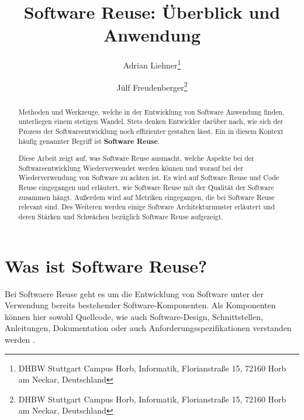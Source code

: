 \documentclass[utf8,biblatex]{lni}
\begin{document}
\title[Software Reuse]{Software Reuse: Überblick und Anwendung}
\author[Adrian Liehner \and Jülf Freudenberger]
{Adrian Liehner\footnote{DHBW Stuttgart Campus Horb, Informatik, Florianstraße 15, 72160 Horb am Neckar, Deutschland } \and
 Jülf Freudenberger\footnote{DHBW Stuttgart Campus Horb, Informatik, Florianstraße 15, 72160 Horb am Neckar, Deutschland }}
\maketitle


\begin{abstract}
Methoden und Werkzeuge, welche in der Entwicklung von Software Anwendung finden, unterliegen einem stetigen Wandel. Stets denken Entwickler darüber nach, wie sich der Prozess der Softwareentwicklung noch effizienter gestalten lässt. Ein in diesem Kontext häufig genannter Begriff ist \textbf{Software Reuse}. 

Diese Arbeit zeigt auf, was Software Reuse ausmacht, welche Aspekte bei der Softwareentwicklung Wiederverwendet werden können und worauf bei der Wiederverwendung von Software zu achten ist. Es wird auf Software Reuse und Code Reuse eingegangen und erläutert, wie Software Reuse mit der Qualität der Software zusammen hängt. Außerdem wird auf Metriken eingegangen, die bei Software Reuse relevant sind. Des Weiteren werden einige Software Architekturmuster erläutert und deren Stärken und Schwächen bezüglich Software Reuse aufgezeigt.
\end{abstract}

\section{Was ist Software Reuse?}

Bei Softwaere Reuse geht es um die Entwicklung von Software unter der Verwendung bereits bestehender Software-Komponenten. Als Komponenten können hier sowohl Quellcode, wie auch Software-Design, Schnittstellen, Anleitungen, Dokumentation oder auch Anforderungsspezifikationen verstanden werden \cite{T4Tutorials.com.04.11.2022}. 
\end{document}

